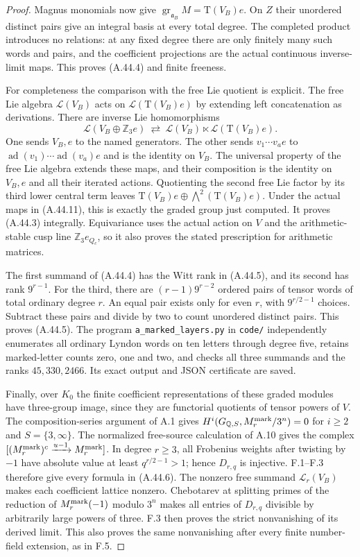 \begin{proof}
Magnus monomials now give
$\operatorname{gr}_{\mathfrak a_B}M=
\mathrm T(V_B)e$. On $Z$ their unordered distinct
pairs give an integral basis at every total degree.
The completed product introduces no relations:
at any fixed degree there are only finitely many
such words and pairs, and the coefficient
projections are the actual continuous inverse-limit
maps. This proves (A.44.4) and finite freeness.

For completeness the comparison with the free
Lie quotient is explicit. The free Lie algebra
$\mathcal L(V_B)$ acts on
$\mathcal L(\mathrm T(V_B)e)$ by extending left
concatenation as derivations. There are inverse
Lie homomorphisms
\[
 \mathcal L(V_B\oplus\mathbb Z_3e)
   \ \rightleftarrows\
 \mathcal L(V_B)\ltimes
       \mathcal L(\mathrm T(V_B)e).
 \tag{A.44.12}
\]
One sends $V_B,e$ to the named generators. The
other sends $v_1\cdots v_a e$ to
$\operatorname{ad}(v_1)\cdots
\operatorname{ad}(v_a)e$ and is the identity
on $V_B$. The universal property of the free
Lie algebra extends these maps, and their
composition is the identity on $V_B,e$ and
all their iterated actions. Quotienting the
second free Lie factor by its third lower
central term leaves
$\mathrm T(V_B)e\oplus
\bigwedge^2(\mathrm T(V_B)e)$.
Under the actual maps in (A.44.11), this is
exactly the graded group just computed.
It proves (A.44.3) integrally. Equivariance
uses the actual action on $V$ and the
arithmetic-stable cusp line
$\mathbb Z_3e_{Q_c}$, so it also proves the
stated prescription for arithmetic matrices.

The first summand of (A.44.4) has the Witt
rank in (A.44.5), and its second has rank
$9^{r-1}$. For the third, there are
$(r-1)9^{r-2}$ ordered pairs of tensor words
of total ordinary degree $r$. An equal pair
exists only for even $r$, with
$9^{r/2-1}$ choices. Subtract these pairs
and divide by two to count unordered distinct
pairs. This proves (A.44.5).
The program \texttt{a\_marked\_layers.py} in
\texttt{code/} independently enumerates all
ordinary Lyndon words on ten letters through
degree five, retains marked-letter counts
zero, one and two, and checks all three
summands and the ranks $45,330,2466$.
Its exact output and JSON certificate are saved.

Finally, over $K_0$ the finite coefficient
representations of these graded modules have
three-group image, since they are functorial
quotients of tensor powers of $V$. The
composition-series argument of A.1 gives
$H^i(G_{\mathbb Q,S},M_r^{\rm mark}/3^n)=0$
for $i\ge2$ and $S=\{3,\infty\}$.
The normalized free-source calculation of
A.10 gives the complex
$[(M_r^{\rm mark})^c\xrightarrow{u-1}
M_r^{\rm mark}]$.
In degree $r\ge3$, all Frobenius weights
after twisting by $-1$ have absolute value
at least $q^{r/2-1}>1$; hence $D_{r,q}$
is injective. F.1--F.3 therefore give every
formula in (A.44.6). The nonzero free
summand $\mathcal L_r(V_B)$ makes each
coefficient lattice nonzero. Chebotarev at
splitting primes of the reduction of
$M_r^{\rm mark}(-1)$ modulo $3^n$
makes all entries of $D_{r,q}$
divisible by arbitrarily large powers of
three. F.3 then proves the strict nonvanishing
of its derived limit. This also proves the
same nonvanishing after every finite
number-field extension, as in F.5.


\end{proof}
